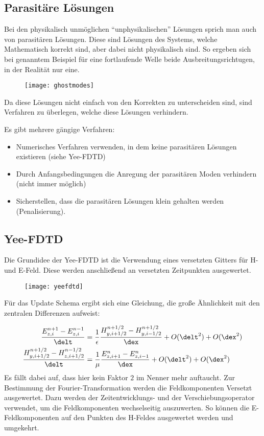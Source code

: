 \subsection{Parasit\"are L\"osungen}
Bei den physikalisch unm\"oglichen ``unphysikalischen'' L\"osungen sprich man auch von parasit\"aren L\"osungen. Diese sind L\"osungen des Systems, welche Mathematisch korrekt sind, aber dabei nicht physikalisch sind. So ergeben sich bei genanntem Beispiel f\"ur eine fortlaufende Welle beide Ausbreitungsrichtugen, in der Realit\"at nur eine.
\par
\begin{figure}[ht]
	\centering
	\texttt{[image: ghostmodes]}
\end{figure}
Da diese L\"osungen nicht einfach von den Korrekten zu unterscheiden sind, sind Verfahren zu \"uberlegen, welche diese L\"osungen verhindern.
\par
Es gibt mehrere g\"angige Verfahren:
\begin{itemize}
	\item Numerisches Verfahren verwenden, in dem keine parasit\"aren L\"osungen existieren (siehe Yee-FDTD)
	\item Durch Anfangsbedingungen die Anregung der parasit\"aren Moden verhindern (nicht immer m\"oglich)
	\item Sicherstellen, dass die parasit\"aren L\"osungen klein gehalten werden (Penalisierung).
\end{itemize}

\subsection{Yee-FDTD}
Die Grundidee der Yee-FDTD ist die Verwendung eines versetzten Gitters f\"ur H- und E-Feld. Diese werden anschlie\ss{}end an versetzten Zeitpunkten ausgewertet.
\par
\begin{figure}[ht]
	\centering
	\texttt{[image: yeefdtd]}
\end{figure}
F\"ur das Update Schema ergibt sich eine Gleichung, die gro\ss{}e \"Ahnlichkeit mit den zentralen Differenzen aufweist:
\par
\begin{align*}
	\frac{E^{n+1}_{z,i} - E^{n-1}_{z,i}}{\delt} &= \frac{1}{\epsilon}\frac{H^{n+1/2}_{y,i+1/2} - H^{n+1/2}_{y,i-1/2}}{\dex} + O(\delt^2) + O(\dex^2) \\
	\frac{H^{n+1/2}_{y,i+1/2} - H^{n-1/2}_{z,i+1/2}}{\delt} &= \frac{1}{\mu}\frac{E^n_{z,i+1} - E^n_{z,i-1}}{\dex} + O(\delt^2) + O(\dex^2)
\end{align*}
Es f\"allt dabei auf, dass hier kein Faktor $2$ im Nenner mehr auftaucht. Zur Bestimmung der Fourier-Transformation werden die Feldkomponenten Versetzt ausgewertet. Dazu werden der Zeitentwicklungs- und der Verschiebungsoperator verwendet, um die Feldkomponenten wechselseitig auszuwerten. So k\"onnen die E-Feldkomponenten auf den Punkten des H-Feldes ausgewertet werden und umgekehrt.

